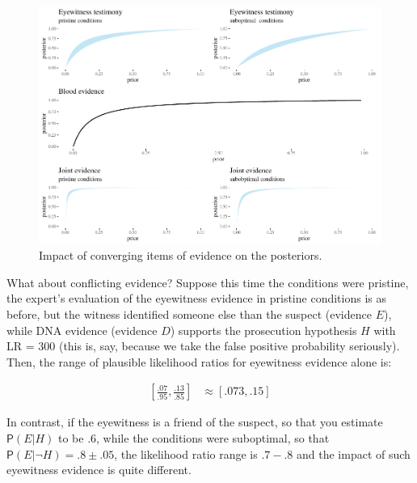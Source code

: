 \documentclass[
  10pt,
  dvipsnames,enabledeprecatedfontcommands]{scrartcl}
\newcommand{\n}{\neg}
\newcommand{\pr}[1]{\mathsf{P}(#1)}
\begin{document}
\begin{figure}[h]

\begin{center}\includegraphics[width=1\linewidth]{lr-chapter3_files/figure-latex/eyewitness2-1} \end{center}
\caption{Impact of converging items of  evidence on the posteriors.}
\label{fig:eyewitness3}
\end{figure}

What about conflicting evidence? Suppose this time the conditions were
pristine, the expert's evaluation of the eyewitness evidence in pristine
conditions is as before, but the witness identified someone else than
the suspect (evidence \(E\)), while DNA evidence (evidence \(D\))
supports the prosecution hypothesis \(H\) with \textsf{LR} = 300 (this
is, say, because we take the false positive probability seriously).
Then, the range of plausible likelihood ratios for eyewitness evidence
alone is:

\begin{align*}
\left[\frac{.07}{.95}, \frac{.13}{.85}    \right ]  & \approx [.073,.15]
\end{align*}

In contrast, if the eyewitness is a friend of the suspect, so that you
estimate \(\pr{E \vert H}\) to be .6, while the conditions were
suboptimal, so that \(\pr{E\vert \n H} = .8\pm .05\), the likelihood
ratio range is \(.7-.8\) and the impact of such eyewitness evidence is
quite different.

\vspace{1mm}
\footnotesize

\normalsize
\end{document}
